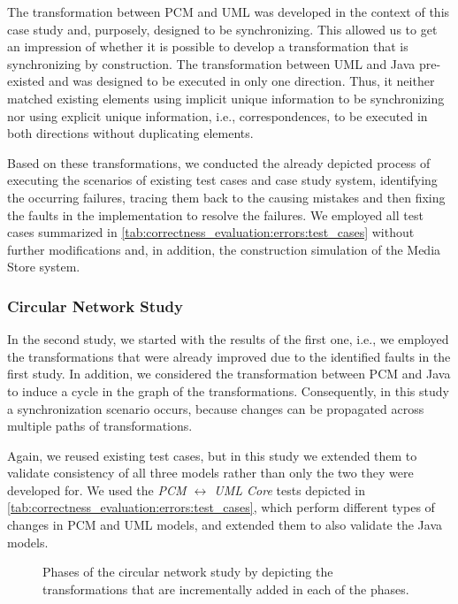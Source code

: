 The transformation between \gls{PCM} and \gls{UML} was developed in the context of this case study and, purposely, designed to be synchronizing.
This allowed us to get an impression of whether it is possible to develop a transformation that is synchronizing by construction.
The transformation between \gls{UML} and Java pre-existed and was designed to be executed in only one direction.
Thus, it neither matched existing elements using implicit unique information to be synchronizing nor using explicit unique information, i.e., correspondences, to be executed in both directions without duplicating elements.

Based on these transformations, we conducted the already depicted process of executing the scenarios of existing test cases and case study system, identifying the occurring failures, tracing them back to the causing mistakes and then fixing the faults in the implementation to resolve the failures.
We employed all test cases summarized in \autoref{tab:correctness_evaluation:errors:test_cases} without further modifications and, in addition, the construction simulation of the Media Store system.

\subsubsection*{Circular Network Study} 

In the second study, we started with the results of the first one, i.e., we employed the transformations that were already improved due to the identified faults in the first study.
In addition, we considered the transformation between \gls{PCM} and Java to induce a cycle in the graph of the transformations.
Consequently, in this study a synchronization scenario occurs, because changes can be propagated across multiple paths of transformations.

Again, we reused existing test cases, but in this study we extended them to validate consistency of all three models rather than only the two they were developed for.
We used the \emph{\gls{PCM} $\leftrightarrow$ \gls{UML} Core} tests depicted in \autoref{tab:correctness_evaluation:errors:test_cases}, which perform different types of changes in \gls{PCM} and \gls{UML} models, and extended them to also validate the Java models.

\begin{figure}
    \centering
    
    \caption[Phases of second case study]{Phases of the circular network study by depicting the transformations that are incrementally added in each of the phases.}
    \label{fig:correctness_evaluation:errors:study_phases}
\end{figure}

